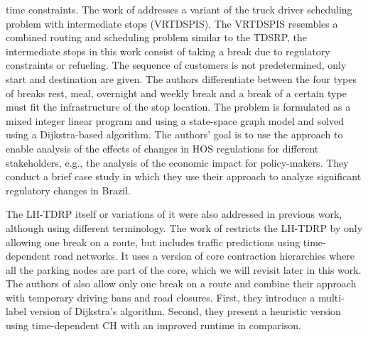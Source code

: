 time constraints. The work of \cite{mayerle:2020} addresses a variant of the truck driver scheduling problem with intermediate stops (VRTDSPIS). The VRTDSPIS resembles a combined routing and scheduling problem similar to the TDSRP, the intermediate stops in this work consist of taking a break due to regulatory constraints or refueling. The sequence of customers is not predetermined, only start and destination are given. The authors differentiate between the four types of breaks rest, meal, overnight and weekly break and a break of a certain type must fit the infrastructure of the stop location. The problem is formulated as a mixed integer linear program and using a state-space graph model and solved using a Dijkstra-based algorithm. The authors' goal is to use the approach to enable analysis of the effects of changes in HOS regulations for different stakeholders, e.g., the analysis of the economic impact for policy-makers. They conduct a brief case study in which they use their approach to analyze significant regulatory changes in Brazil.

The LH-TDRP itself or variations of it were also addressed in previous work, although using different terminology. The work of \cite{kleff:2017} restricts the LH-TDRP by only allowing one break on a route, but includes traffic predictions using time-dependent road networks. It uses a version of core contraction hierarchies where all the parking nodes are part of the core, which we will revisit later in this work. The authors of \cite{tuin:2018} also allow only one break on a route and combine their approach with temporary driving bans and road closures. First, they introduce a multi-label version of Dijkstra's algorithm. Second, they present a heuristic version using time-dependent CH with an improved runtime in comparison.

